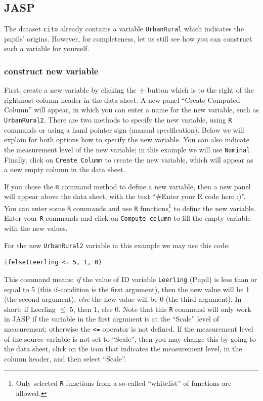 \documentclass[
]{book}
\begin{document}
\subsection{JASP}\label{jasp-9}

The dataset \texttt{cito} already contains a variable \texttt{UrbanRural} which indicates the pupils' origins.
However, for completeness, let us still see how you can construct such a variable for yourself.

\subsubsection{construct new variable}\label{construct-new-variable-1}

First, create a new variable by clicking the \textbf{+} button which is to the right of the rightmost column header in the data sheet. A new panel ``Create Computed Column'' will appear, in which you can enter a name for the new variable, such as \texttt{UrbanRural2}.
There are two methods to specify the new variable, using \texttt{R} commands or using a hand pointer sign (manual specification). Below we will explain for both options how to specify the new variable. You can also indicate the measurement level of the new variable; in this example we will use \texttt{Nominal}. Finally, click on \texttt{Create\ Column} to create the new variable, which will appear as a new empty column in the data sheet.

If you chose the \texttt{R} command method to define a new variable, then a new panel will appear above the data sheet, with the text ``\#Enter your R code here :)''. You can enter some \texttt{R} commands and use \texttt{R} functions\footnote{Only selected \texttt{R} functions from a so-called ``whitelist'' of functions are allowed.} to define the new variable. Enter your \texttt{R} commands and click on \texttt{Compute\ column} to fill the empty variable with the new values.

For the new \texttt{UrbanRural2} variable in this example we may use this code:

\begin{verbatim}
ifelse(Leerling <= 5, 1, 0) 
\end{verbatim}

This command means: \emph{if} the value of ID variable \texttt{Leerling} (Pupil) is less than or equal to 5 (this if-condition is the first argument), then the new value will be 1 (the second argument), \emph{else} the new value will be 0 (the third argument). In short: if Leerling \(\leq\) 5, then 1, else 0.
Note that this \texttt{R} command will only work in JASP if the variable in the first argument is at the ``Scale'' level of measurement; otherwise the \texttt{\textless{}=} operator is not defined. If the measurement level of the source variable is not set to ``Scale'', then you may change this by going to the data sheet, click on the icon that indicates the measurement level, in the column header, and then select ``Scale''.
\end{document}
